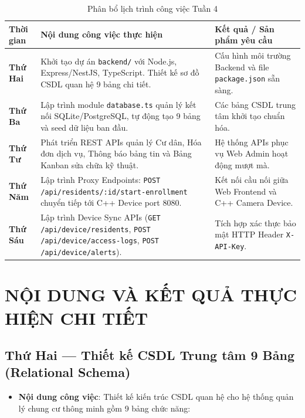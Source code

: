 \documentclass[12pt,a4paper]{article}
\begin{document}
\begin{table}[H]
\centering
\small
\begin{tabularx}{\textwidth}{|l|X|X|}
\hline
\textbf{Thời gian} & \textbf{Nội dung công việc thực hiện} & \textbf{Kết quả / Sản phẩm yêu cầu} \\ \hline
\textbf{Thứ Hai} & Khởi tạo dự án \texttt{backend/} với Node.js, Express/NestJS, TypeScript. Thiết kế sơ đồ CSDL quan hệ 9 bảng chi tiết. & Cấu hình môi trường Backend và file \texttt{package.json} sẵn sàng. \\ \hline
\textbf{Thứ Ba} & Lập trình module \texttt{database.ts} quản lý kết nối SQLite/PostgreSQL, tự động tạo 9 bảng và seed dữ liệu ban đầu. & Các bảng CSDL trung tâm khởi tạo chuẩn hóa. \\ \hline
\textbf{Thứ Tư} & Phát triển REST APIs quản lý Cư dân, Hóa đơn dịch vụ, Thông báo bảng tin và Bảng Kanban sửa chữa kỹ thuật. & Hệ thống APIs phục vụ Web Admin hoạt động mượt mà. \\ \hline
\textbf{Thứ Năm} & Lập trình Proxy Endpoints: \texttt{POST /api/residents/:id/start-enrollment} chuyển tiếp tới C++ Device port 8080. & Kết nối cầu nối giữa Web Frontend và C++ Camera Device. \\ \hline
\textbf{Thứ Sáu} & Lập trình Device Sync APIs (\texttt{GET /api/device/residents}, \texttt{POST /api/device/access-logs}, \texttt{POST /api/device/alerts}). & Tích hợp xác thực bảo mật HTTP Header \texttt{X-API-Key}. \\ \hline
\end{tabularx}
\caption{Phân bổ lịch trình công việc Tuần 4}
\end{table}

\newpage

\section{NỘI DUNG VÀ KẾT QUẢ THỰC HIỆN CHI TIẾT}

\subsection{Thứ Hai — Thiết kế CSDL Trung tâm 9 Bảng (Relational Schema)}
\begin{itemize}
    \item \textbf{Nội dung công việc}: Thiết kế kiến trúc CSDL quan hệ cho hệ thống quản lý chung cư thông minh gồm 9 bảng chức năng:
\end{itemize}
\end{document}
